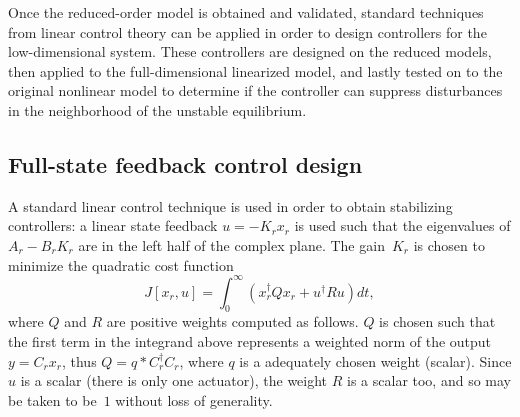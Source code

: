 \documentclass[12pt,lot, lof]{puthesis}
\begin{document}
Once the reduced-order model is obtained and validated, standard techniques from linear control theory can be applied in order to design controllers for the low-dimensional system. These controllers are designed on the reduced models, then applied to the full-dimensional linearized model, and lastly tested on to the original nonlinear model to determine if the controller can suppress disturbances in the neighborhood of the unstable equilibrium.
\subsection{Full-state feedback control design}

A standard linear control technique is used in order to obtain stabilizing controllers:
a linear state feedback $u=-K_r x_r $ is used such that the eigenvalues of $ A_r-B_r K_r $ are in the left half of the complex plane.  The gain~$K_r$ is chosen to minimize the quadratic cost function
\begin{equation}
J[x_r,u ] = \int_0^{\infty} \left( x_r^\dagger Q x_r + u^\dagger R u \right) dt,
\end{equation}
where $Q$ and $R$ are positive weights computed as follows.  $Q$ is chosen such that the first term in the integrand above represents a weighted norm of the output $y  = C_r x_r $, thus $Q = q * C^\dagger_r C_r$, where $q$ is a adequately chosen weight (scalar).
Since $u$ is a scalar (there is only one actuator), the weight $R$ is a scalar too, and so may be taken to be~$1$ without loss of generality.
\end{document}
